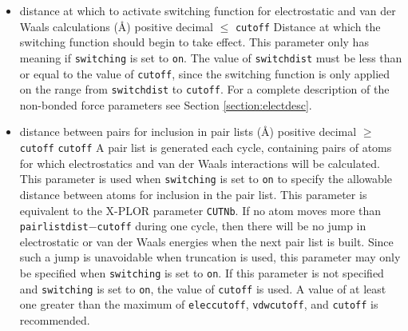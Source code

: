 \begin{itemize}

\item
{}%
{distance at which to activate switching function 
for electrostatic and van der Waals calculations (\AA)}%
{positive decimal $\leq$ \verb!cutoff!}%
{Distance at which the switching function
should begin to take effect.  
This parameter only has meaning if \verb!switching! is 
set to \verb!on!.  
The value of \verb!switchdist! must be less than
or equal to the value of \verb!cutoff!, since the switching function
is only applied on the range from \verb!switchdist! to \verb!cutoff!.  
For a complete description of the non-bonded force parameters see
Section \ref{section:electdesc}.}

\item
{}%
{distance between pairs for inclusion in pair lists (\AA)}%
{positive decimal $\geq$ \verb!cutoff!}%
{\verb!cutoff!}%
{%
A pair list is generated each cycle, 
containing pairs of atoms for which 
electrostatics and van der Waals interactions will be calculated.
This parameter is used when \verb!switching! is set to \verb!on! to
specify the allowable distance between atoms for inclusion in the
pair list.  
This parameter is equivalent to the X-PLOR parameter \verb!CUTNb!.
If no atom moves more than \verb!pairlistdist!$-$\verb!cutoff! during
one cycle, then there will be no jump in electrostatic or van der
Waals energies when the next pair list is built.  Since such a jump
is unavoidable when truncation is used, this parameter may only
be specified when \verb!switching! is set to \verb!on!.  If this
parameter is not specified and \verb!switching! is set to \verb!on!,
the value of \verb!cutoff! is used.  
A value of at least one greater than the maximum of 
\verb!eleccutoff!, \verb!vdwcutoff!, and \verb!cutoff! 
is recommended.  
}


\end{itemize}
